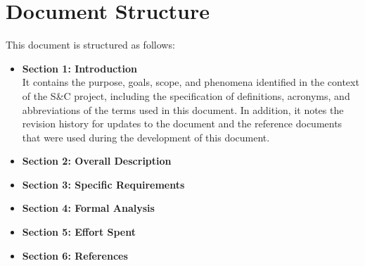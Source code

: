 \section{Document Structure}\label{sec:structure}
This document is structured as follows:
\begin{itemize}
    \item \textbf{Section 1: Introduction} 
    \\It contains the purpose, goals, scope, and phenomena identified in the context of the S\&C project, 
    including the specification of definitions, acronyms, and abbreviations of the terms used in this document. In addition, it notes the revision 
    history for updates to the document and the reference documents that were used during the development of this document.
    \item \textbf{Section 2: Overall Description}
    \item \textbf{Section 3: Specific Requirements}
    \item \textbf{Section 4: Formal Analysis}
    \item \textbf{Section 5: Effort Spent}
    \item \textbf{Section 6: References}
\end{itemize}